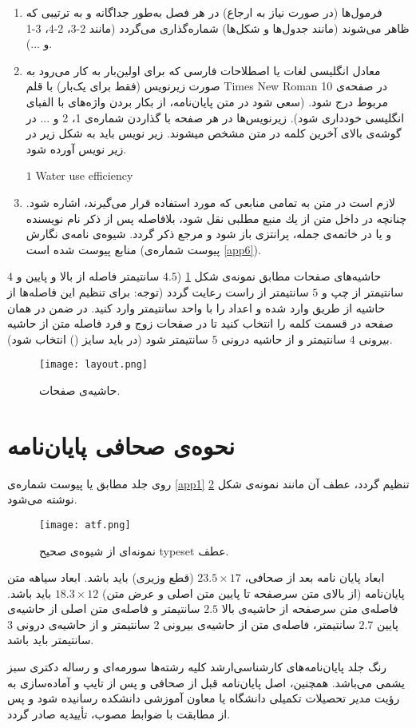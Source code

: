 \begin{enumerate}
				\item فرمول‌ها (در صورت نیاز به ارجاع) در هر فصل به‌طور جداگانه و به ترتیبی که ظاهر می‌شوند (مانند جدول‌ها و شکل‌ها) شماره‌گذاری می‌گردد (مانند 2-3، 2-4، 3-1 و ...).
				\item معادل انگلیسی لغات یا اصطلاحات فارسی که برای اولین‌بار به کار می‌رود به صورت زیرنویس (فقط برای یک‌بار) با قلم Times New Roman 10 در صفحه‌ی مربوط درج شود. (سعی شود در متن پایان‌نامه‌، از بکار بردن واژه‌های با الفبای انگلیسی خودداری شود). زیرنویس‌ها در هر صفحه با گذاردن شماره‌ی 1، 2 و ... در گوشه‌ی بالای آخرین کلمه در متن مشخص میشوند. زیر نویس باید به شکل زیر در زیر نویس آورده شود. \\
\begin{latin}
\footnotesize	$1$ Water use efficiency
\end{latin}
				\item لازم است در متن به تمامی منابعی كه مورد استفاده قرار می‌گیرند، اشاره شود. چنانچه در داخل متن از یك منبع مطلبی نقل شود، بلافاصله پس از ذكر نام نویسنده و یا در خاتمه‌ی جمله، پرانتزی باز شود و مرجع ذكر گردد. شیوه‌ی نامه‌ی نگارش منابع پیوست شده است (پیوست شماره‌ی \ref{app6}).
				
			\end{enumerate}

		حاشیه‌های صفحات مطابق نمونه‌ی شکل \ref{layout} ($4.5$ سانتیمتر فاصله از بالا و پایین و $4$ سانتیمتر از چپ و $5$ سانتیمتر از راست رعایت گردد (توجه: برای تنظیم این فاصله‌ها از حاشیه از طریق  وارد  شده و اعداد را با واحد سانتیمتر وارد کنید. در ضمن در همان صفحه در قسمت  کلمه  را انتخاب کنید تا در صفحات زوج و فرد فاصله متن از حاشیه بیرونی $4$ سانتیمتر و از حاشیه درونی $5$ سانتیمتر شود (در  باید سایز () انتخاب شود).
		
		\begin{figure}
	\centering
	\texttt{[image: layout.png]}
\caption{حاشیه‌ی صفحات.}
\label{layout}
\end{figure}
\section{نحوه‌ی صحافی پایان‌نامه}
	روی جلد مطابق یا پیوست شماره‌ی \ref{app1} تنظیم گردد، عطف آن مانند نمونه‌ی شکل \ref{atf} نوشته می‌شود.
	\begin{figure}
	\centering
	\texttt{[image: atf.png]}
\caption{نمونه‌ای از شیوه‌ی صحیح \gls*{typeset} عطف.}
\label{atf}
\end{figure}
ابعاد پایان نامه بعد از صحافی، $23.5 \times 17$ (قطع وزیری) باید باشد. ابعاد سیاهه متن پایان‌نامه (از بالای متن سرصفحه تا پایین متن اصلی و عرض متن) $18.3 \times 12$ باید باشد. 
فاصله‌ی متن سرصفحه از حاشیه‌ی بالا $2.5$ سانتیمتر و فاصله‌ی متن اصلی از حاشیه‌ی پایین $2.7$ سانتیمتر، فاصله‌ی متن از حاشیه‌ی بیرونی $2$ سانتیمتر و از حاشیه‌ی درونی $3$ سانتیمتر باید باشد.  

رنگ جلد پایان‌نامه‌های کارشناسی‌ارشد کلیه رشته‌ها سورمه‌ای و رساله دکتری سبز یشمی می‌باشد. همچنین، اصل پایان‌نامه قبل از صحافی و پس از تایپ و آماده‌سازی به رؤیت مدیر تحصیلات تكمیلی دانشگاه یا معاون آموزشی دانشكده رسانیده شود و پس از مطابقت با ضوابط مصوب، تأییدیه صادر گردد.


